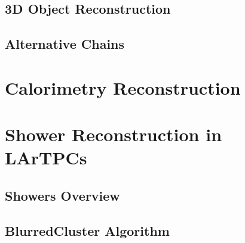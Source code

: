 \subsection{3D Object Reconstruction}\label{sec:3DReconstruction}

\subsection{Alternative Chains}\label{sec:AlternativeChains}

\section{Calorimetry Reconstruction}\label{sec:Calorimetry}

\section{Shower Reconstruction in LArTPCs}\label{sec:ShowerReconstruction}

\subsection{Showers Overview}\label{sec:ShowersOverview}

\subsection{BlurredCluster Algorithm}\label{sec:BlurredCluster}

